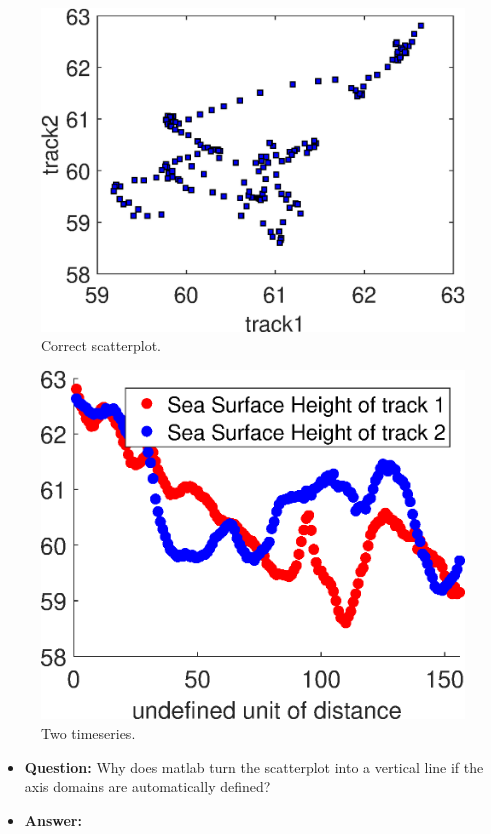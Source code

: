 \begin{figure}[h!]
    \centering
    \includegraphics{images/matlabEx1/scatterplot.eps}
    \caption{Correct scatterplot.}
    \label{fig:vertical_line}
\end{figure}
\begin{figure}[h!]
    \centering
    \includegraphics{images/matlabEx1/twoTimeSeries}
    \caption{Two timeseries.}
    \label{fig:vertical_line}
\end{figure}

\begin{itemize}
    \item \textbf{Question:} Why does matlab turn the scatterplot into a vertical line if the axis domains are automatically defined?
    \item \textbf{Answer:}
\end{itemize}

